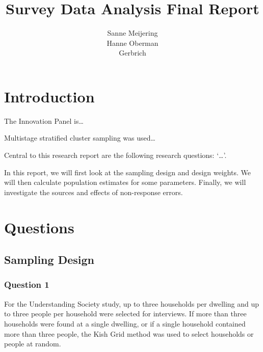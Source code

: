 \documentclass[]{article}
\title{Survey Data Analysis Final Report}
\author{Sanne Meijering \\ Hanne Oberman \\ Gerbrich}
\date{}
\newenvironment{Shaded}{\begin{snugshade}}{\end{snugshade}}
\newcommand{\KeywordTok}[1]{\textcolor[rgb]{0.13,0.29,0.53}{\textbf{#1}}}
\newcommand{\StringTok}[1]{\textcolor[rgb]{0.31,0.60,0.02}{#1}}
\newcommand{\OperatorTok}[1]{\textcolor[rgb]{0.81,0.36,0.00}{\textbf{#1}}}
\newcommand{\NormalTok}[1]{#1}
\begin{document}
\maketitle

\begin{Shaded}
\end{Shaded}

\section{Introduction}\label{introduction}

The Innovation Panel is\ldots{}

Multistage stratified cluster sampling was used\ldots{}

Central to this research report are the following research questions:
`\ldots{}'.

In this report, we will first look at the sampling design and design
weights. We will then calculate population estimates for some
parameters. Finally, we will investigate the sources and effects of
non-response errors.

\section{Questions}\label{questions}

\subsection{Sampling Design}\label{sampling-design}

\subsubsection{Question 1}\label{question-1}

For the Understanding Society study, up to three households per dwelling
and up to three people per household were selected for interviews. If
more than three households were found at a single dwelling, or if a
single household contained more than three people, the Kish Grid method
was used to select households or people at random.
\end{document}
